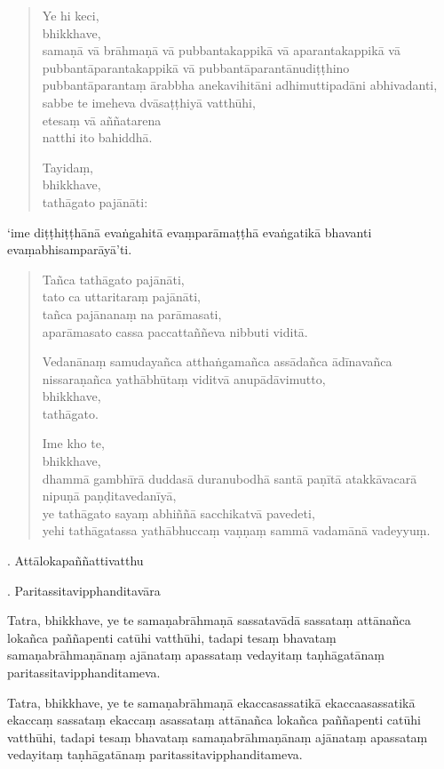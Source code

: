 \documentclass[11pt,twoside,openright]{book}
\begin{document}
\begin{verse}
Ye hi keci,\\
\vin  bhikkhave,\\
\vin  samaṇā vā brāhmaṇā vā pubbantakappikā vā aparantakappikā vā pubbantāparantakappikā vā pubbantāparantānudiṭṭhino pubbantāparantaṃ ārabbha anekavihitāni adhimuttipadāni abhivadanti,\\
\vin  sabbe te imeheva dvāsaṭṭhiyā vatthūhi,\\
\vin  etesaṃ vā aññatarena\\
 natthi ito bahiddhā.

Tayidaṃ,\\
\vin  bhikkhave,\\
\vin  tathāgato pajānāti:

\end{verse}
\pstart
‘ime diṭṭhiṭṭhānā evaṅgahitā evaṃparāmaṭṭhā evaṅgatikā bhavanti evaṃabhisamparāyā’ti.
\pend

\begin{verse}
Tañca tathāgato pajānāti,\\
\vin  tato ca uttaritaraṃ pajānāti,\\
\vin  tañca pajānanaṃ na parāmasati,\\
\vin  aparāmasato cassa paccattaññeva nibbuti viditā.

Vedanānaṃ samudayañca atthaṅgamañca assādañca ādīnavañca nissaraṇañca yathābhūtaṃ viditvā anupādāvimutto,\\
\vin  bhikkhave,\\
\vin  tathāgato.

Ime kho te,\\
\vin  bhikkhave,\\
\vin  dhammā gambhīrā duddasā duranubodhā santā paṇītā atakkāvacarā nipuṇā paṇḍitavedanīyā,\\
\vin  ye tathāgato sayaṃ abhiññā sacchikatvā pavedeti,\\
\vin  yehi tathāgatassa yathābhuccaṃ vaṇṇaṃ sammā vadamānā vadeyyuṃ.

\end{verse}
. Attālokapaññattivatthu
\pend

. Paritassitavipphanditavāra
\pend

\pstart
Tatra, bhikkhave, ye te samaṇabrāhmaṇā sassatavādā sassataṃ attānañca lokañca paññapenti catūhi vatthūhi, tadapi tesaṃ bhavataṃ samaṇabrāhmaṇānaṃ ajānataṃ apassataṃ vedayitaṃ taṇhāgatānaṃ paritassitavipphanditameva.
\pend

\pstart
Tatra, bhikkhave, ye te samaṇabrāhmaṇā ekaccasassatikā ekaccaasassatikā ekaccaṃ sassataṃ ekaccaṃ asassataṃ attānañca lokañca paññapenti catūhi vatthūhi, tadapi tesaṃ bhavataṃ samaṇabrāhmaṇānaṃ ajānataṃ apassataṃ vedayitaṃ taṇhāgatānaṃ paritassitavipphanditameva.
\pend
\end{document}
